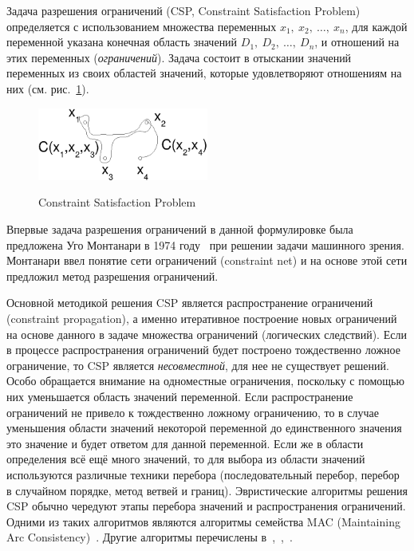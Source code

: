 Задача разрешения ограничений (CSP, Constraint Satisfaction
Problem)~\cite{CSP} определяется с использованием множества
переменных $x_1,~x_2,~\dots,~x_n$, для каждой переменной указана
конечная область значений $D_1,~D_2,~\dots,~D_n$, и отношений на
этих переменных (\emph{ограничений}). Задача состоит в отыскании
значений переменных из своих областей значений, которые
удовлетворяют отношениям на них (см. рис.~\ref{csp}).

\begin{figure}[h] \center
  \includegraphics[width=0.5\textwidth]{2.theor/csp}\\
  \caption{Constraint Satisfaction Problem}\label{csp}
\end{figure}

Впервые задача разрешения ограничений в данной формулировке была
предложена Уго Монтанари в 1974 году~\cite{montanari} при решении
задачи машинного зрения. Монтанари ввел понятие сети ограничений
(constraint net) и на основе этой сети предложил метод разрешения
ограничений.

Основной методикой решения CSP является распространение ограничений
(constraint propagation), а именно итеративное построение новых
ограничений на основе данного в задаче множества ограничений
(логических следствий). Если в процессе распространения ограничений
будет построено тождественно ложное ограничение, то CSP является
\emph{несовместной}, для нее не существует решений. Особо обращается
внимание на одноместные ограничения, поскольку с помощью них
уменьшается область значений переменной. Если распространение
ограничений не привело к тождественно ложному ограничению, то в
случае уменьшения области значений некоторой переменной до
единственного значения это значение и будет ответом для данной
переменной. Если же в области определения всё ещё много значений, то
для выбора из области значений используются различные техники
перебора (последовательный перебор, перебор в случайном порядке,
метод ветвей и границ). Эвристические алгоритмы решения CSP обычно
чередуют этапы перебора значений и распространения ограничений.
Одними из таких алгоритмов являются алгоритмы семейства MAC
(Maintaining Arc Consistency)~\cite{CSP}. Другие алгоритмы
перечислены в~\cite{CSPS1},~\cite{CSPS2},~\cite{CSPS3}.


